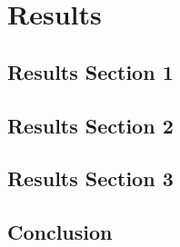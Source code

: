 %
\chapter{Results}
\label{sec:results}


\Blindtext[2][1]

\section{Results Section 1}
\label{sec:results:sec1}

\Blindtext[2][2]

\section{Results Section 2}
\label{sec:results:sec2}

\Blindtext[3][2]

\section{Results Section 3}
\label{sec:results:sec3}

\Blindtext[4][2]

\section{Conclusion}
\label{sec:results:conclusion}

\Blindtext[2][1]